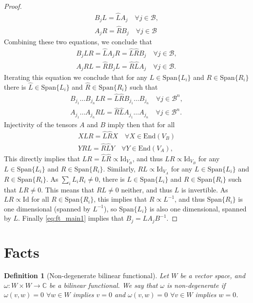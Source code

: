\documentclass{article}
\newtheorem{definition}{Definition}
\newcommand{\id}{\mathrm{Id}}
\newcommand{\End}{\mathrm{End}}
\newcommand{\Span}{\mathrm{Span}}
\begin{document}
\begin{proof}
  \begin{align}
    B_jL = \hat{L}A_j \quad \forall j \in \mathcal{B}, \label{eq:ft_main1}\\
    A_jR = \hat R B_j \quad \forall j \in \mathcal{B} \label{eq:ft_main2}
  \end{align}  
  Combining these two equations, we conclude that
  \begin{align*}
    B_j LR = \hat L A_j R = \hat L \hat R B_j \quad \forall j\in\mathcal{B},\\
    A_j RL = \hat R B_j L = \hat R \hat L A_j \quad \forall j\in\mathcal{B}.
  \end{align*}
  Iterating this equation we conclude that for any $L\in\Span\{L_i\}$ and $R\in\Span\{R_i\}$ there is $ \hat{L} \in \Span\{L_i\}$ and  $\hat{R} \in \Span\{R_i\}$ such that 
  \begin{align*}
    B_{j_1} \dots B_{j_n} LR = \hat L \hat R B_{j_1} \dots B_{j_n} \quad \forall j\in\mathcal{B}^n, \\
    A_{j_1} \dots A_{j_n} RL = \hat R \hat L A_{j_1} \dots A_{j_n} \quad \forall j\in\mathcal{B}^n.
  \end{align*}
  Injectivity of the tensors $A$ and $B$ imply then that for all 
  \begin{align*}
    X LR = \hat L \hat R X \quad \forall X\in \End(V_B) \\
    Y RL = \hat R \hat L Y \quad \forall Y\in \End(V_A),
  \end{align*}
  This directly implies that $LR = \hat{L}\hat{R} \propto \id_{V_B}$, and thus $LR\propto \id_{V_B}$ for any $L\in\Span\{L_i\}$ and $R\in \Span\{R_i\}$. Similarly, $RL\propto \id_{V_A}$ for any $L\in\Span\{L_i\}$ and $R\in \Span\{R_i\}$.  As $\sum_i L_i R_i \neq 0$, there is $L\in \Span\{L_i\}$ and $R\in \Span\{R_i\}$ such that $LR\neq 0$. This means that $RL\neq 0$ neither, and thus $L$ is invertible. As $LR \propto \id$ for all $R\in \Span\{R_i\}$, this implies that $R\propto L^{-1}$, and thus $\Span\{R_i\}$ is one dimensional (spanned by $L^{-1}$), so $\Span\{L_i\}$ is also one dimensional, spanned by $L$. Finally \cref{eq:ft_main1} implies that $B_j = LA_j B^{-1}$.
\end{proof}


\appendix

\section{Facts}

\begin{definition}[Non-degenerate bilinear functional]\label{def:nondegen_bili_fcnl}
  Let $W$ be a vector space, and $\omega: W\times W\to \mathbb{C}$ be a bilinear functional.
  We say that $\omega$ is non-degenerate if $\omega(v,w) = 0$ $\forall w\in W$ implies $v=0$ and $\omega(v,w) = 0$ $\forall v\in W$ implies $w=0$.
\end{definition}
\end{document}
